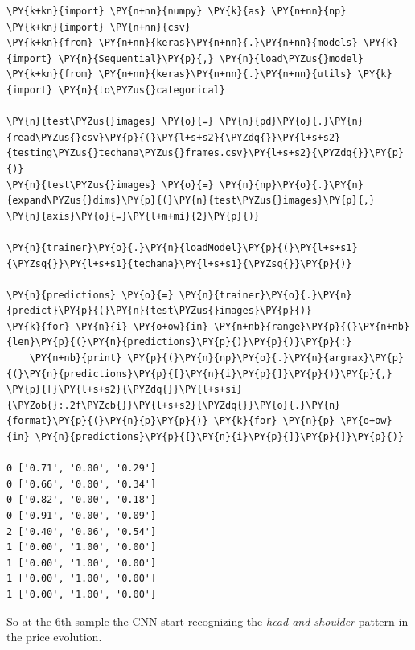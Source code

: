     \begin{tcolorbox}[breakable, size=fbox, boxrule=1pt, pad at break*=1mm,colback=cellbackground, colframe=cellborder]
\begin{Verbatim}[commandchars=\\\{\}]
\PY{k+kn}{import} \PY{n+nn}{numpy} \PY{k}{as} \PY{n+nn}{np}
\PY{k+kn}{import} \PY{n+nn}{csv}
\PY{k+kn}{from} \PY{n+nn}{keras}\PY{n+nn}{.}\PY{n+nn}{models} \PY{k}{import} \PY{n}{Sequential}\PY{p}{,} \PY{n}{load\PYZus{}model}
\PY{k+kn}{from} \PY{n+nn}{keras}\PY{n+nn}{.}\PY{n+nn}{utils} \PY{k}{import} \PY{n}{to\PYZus{}categorical}

\PY{n}{test\PYZus{}images} \PY{o}{=} \PY{n}{pd}\PY{o}{.}\PY{n}{read\PYZus{}csv}\PY{p}{(}\PY{l+s+s2}{\PYZdq{}}\PY{l+s+s2}{testing\PYZus{}techana\PYZus{}frames.csv}\PY{l+s+s2}{\PYZdq{}}\PY{p}{)}
\PY{n}{test\PYZus{}images} \PY{o}{=} \PY{n}{np}\PY{o}{.}\PY{n}{expand\PYZus{}dims}\PY{p}{(}\PY{n}{test\PYZus{}images}\PY{p}{,} \PY{n}{axis}\PY{o}{=}\PY{l+m+mi}{2}\PY{p}{)}

\PY{n}{trainer}\PY{o}{.}\PY{n}{loadModel}\PY{p}{(}\PY{l+s+s1}{\PYZsq{}}\PY{l+s+s1}{techana}\PY{l+s+s1}{\PYZsq{}}\PY{p}{)}

\PY{n}{predictions} \PY{o}{=} \PY{n}{trainer}\PY{o}{.}\PY{n}{predict}\PY{p}{(}\PY{n}{test\PYZus{}images}\PY{p}{)}
\PY{k}{for} \PY{n}{i} \PY{o+ow}{in} \PY{n+nb}{range}\PY{p}{(}\PY{n+nb}{len}\PY{p}{(}\PY{n}{predictions}\PY{p}{)}\PY{p}{)}\PY{p}{:}
    \PY{n+nb}{print} \PY{p}{(}\PY{n}{np}\PY{o}{.}\PY{n}{argmax}\PY{p}{(}\PY{n}{predictions}\PY{p}{[}\PY{n}{i}\PY{p}{]}\PY{p}{)}\PY{p}{,} \PY{p}{[}\PY{l+s+s2}{\PYZdq{}}\PY{l+s+si}{\PYZob{}:.2f\PYZcb{}}\PY{l+s+s2}{\PYZdq{}}\PY{o}{.}\PY{n}{format}\PY{p}{(}\PY{n}{p}\PY{p}{)} \PY{k}{for} \PY{n}{p} \PY{o+ow}{in} \PY{n}{predictions}\PY{p}{[}\PY{n}{i}\PY{p}{]}\PY{p}{]}\PY{p}{)}

0 ['0.71', '0.00', '0.29']
0 ['0.66', '0.00', '0.34']
0 ['0.82', '0.00', '0.18']
0 ['0.91', '0.00', '0.09']
2 ['0.40', '0.06', '0.54']
1 ['0.00', '1.00', '0.00']
1 ['0.00', '1.00', '0.00']
1 ['0.00', '1.00', '0.00']
1 ['0.00', '1.00', '0.00']
    \end{Verbatim}
\end{tcolorbox}

    So at the 6th sample the CNN start recognizing the \emph{head and
shoulder} pattern in the price evolution.
